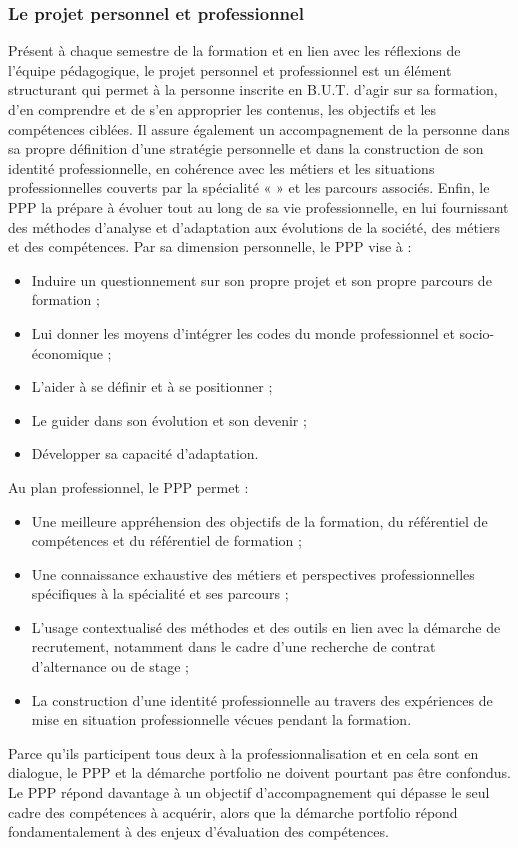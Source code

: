 \documentclass[10pt]{article}
\begin{document}
\subsubsection*{Le projet personnel et professionnel}
Présent à chaque semestre de la formation et en lien avec les réflexions
de l’équipe pédagogique, le projet personnel et professionnel est un
élément structurant qui permet à la personne inscrite en B.U.T. d’agir
sur sa formation, d’en comprendre et de s’en approprier les contenus,
les objectifs et les compétences ciblées. Il assure également un
accompagnement de la personne dans sa propre définition d’une stratégie
personnelle et dans la construction de son identité professionnelle, en
cohérence avec les métiers et les situations professionnelles couverts
par la spécialité «  » et les parcours
associés. Enfin, le PPP la prépare à évoluer tout au long de sa vie
professionnelle, en lui fournissant des méthodes d’analyse et
d’adaptation aux évolutions de la société, des métiers et des
compétences.  Par sa dimension personnelle, le PPP vise à :
\begin{itemize}
\item Induire un questionnement sur son propre projet et son propre
  parcours de formation ;
\item Lui donner les moyens d’intégrer les codes du
  monde professionnel et socio-économique ;
\item L’aider à se définir et à se positionner ;
\item Le guider dans son évolution et son devenir ;
\item Développer sa capacité d’adaptation.
\end{itemize}
Au plan professionnel, le PPP permet :
\begin{itemize}
\item Une meilleure appréhension des objectifs de la formation, du
  référentiel de compétences et du référentiel de formation ;
\item Une connaissance exhaustive des métiers et perspectives
  professionnelles spécifiques à la spécialité et ses parcours ;
\item L’usage contextualisé des méthodes et des outils en lien avec la
  démarche de recrutement, notamment dans le cadre d’une recherche de
  contrat d’alternance ou de stage ;
\item La construction d’une identité professionnelle au travers des
  expériences de mise en situation professionnelle vécues pendant la
  formation.
\end{itemize}
Parce qu’ils participent tous deux à la professionnalisation et en cela
sont en dialogue, le PPP et la démarche portfolio ne doivent pourtant
pas être confondus. Le PPP répond davantage à un objectif
d’accompagnement qui dépasse le seul cadre des compétences à acquérir,
alors que la démarche portfolio répond fondamentalement à des enjeux
d’évaluation des compétences.
\end{document}
